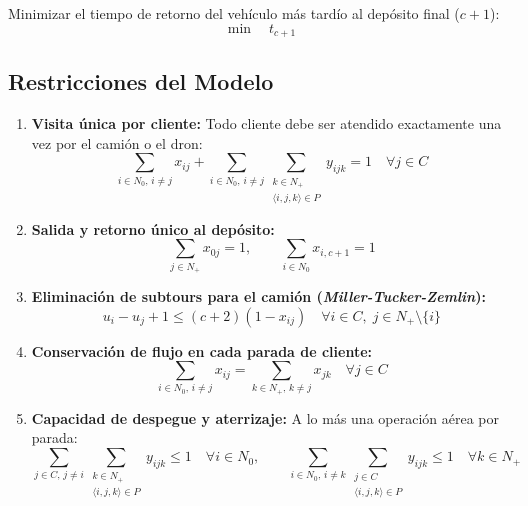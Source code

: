 Minimizar el tiempo de retorno del vehículo más tardío al depósito final ($c+1$):
\begin{equation}
\min \quad t_{c+1} \tag{1}
\end{equation}

\subsection{Restricciones del Modelo}

\begin{enumerate}[label=\textbf{\arabic*.}, leftmargin=*, itemsep=1.0pt, topsep=1.5pt, parsep=0pt]

\item \textbf{Visita única por cliente:} Todo cliente debe ser atendido exactamente una vez por el camión o el dron:
\begin{equation}
\sum_{i \in N_0,\, i \neq j} x_{ij} + \sum_{i \in N_0,\, i \neq j} \sum_{\substack{k \in N_+ \\ \langle i,j,k \rangle \in P}} y_{ijk} = 1 \quad \forall j \in C 
\tag{2}
\end{equation}

\item \textbf{Salida y retorno único al depósito:}
\begin{equation}
\sum_{j \in N_+} x_{0j} = 1, \qquad \sum_{i \in N_0} x_{i, c+1} = 1 
\tag{3--4}
\end{equation}

\item \textbf{Eliminación de subtours para el camión (\textit{Miller-Tucker-Zemlin}):}
\begin{equation}
u_i - u_j + 1 \le (c+2)(1 - x_{ij}) \quad \forall i \in C, \; j \in N_+ \setminus \{i\} 
\tag{5}
\end{equation}

\item \textbf{Conservación de flujo en cada parada de cliente:}
\begin{equation}
\sum_{i \in N_0,\, i \neq j} x_{ij} = \sum_{k \in N_+,\, k \neq j} x_{jk} \quad \forall j \in C 
\tag{6}
\end{equation}

\item \textbf{Capacidad de despegue y aterrizaje:} A lo más una operación aérea por parada:
\begin{equation}
\sum_{j \in C,\, j \neq i} \sum_{\substack{k \in N_+ \\ \langle i,j,k \rangle \in P}} y_{ijk} \le 1 \quad \forall i \in N_0, \qquad \sum_{i \in N_0,\, i \neq k} \sum_{\substack{j \in C \\ \langle i,j,k \rangle \in P}} y_{ijk} \le 1 \quad \forall k \in N_+ 
\tag{7--8}
\end{equation}


\end{enumerate}
